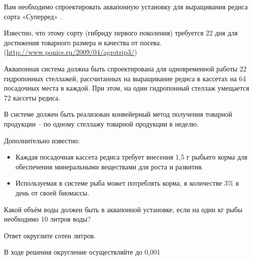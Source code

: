 
Вам необходимо спроектировать аквапонную установку для выращивания редиса сорта  «Суперред» .

Известно, что этому сорту (гибриду первого поколения) требуется  22 дня  для достижения товарного размера и качества от посева.  (\url{http://www.ponics.ru/2009/04/agrotrip3/})

Аквапонная система должна быть спроектирована для одновременной работы 22 гидропонных стеллажей, рассчитанных на выращивание редиса в кассетах на 64 посадочных места в каждой. При этом, на один гидропонный стеллаж умещается 72 кассеты редиса.

В системе должен быть реализован конвейерный метод получения товарной продукции – по одному стеллажу товарной продукции в неделю.

Дополнительно известно:

\begin{itemize}
    \item Каждая посадочная кассета редиса требует внесения  1,5 г рыбьего корма для обеспечения минеральными веществами для роста и развития.
    \item Используемая в системе рыба может потреблять корма, в количестве $3\%$ в день от своей биомассы.
\end{itemize}

Какой объём воды должен быть в аквапонной установке, если на один кг рыбы необходимо 10 литров воды?

Ответ округлите сотен литров.

В ходе решения округление осуществляйте до 0,001